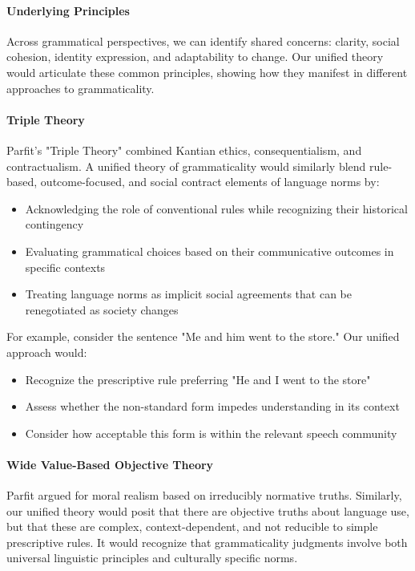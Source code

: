 \paragraph{Underlying Principles} Across grammatical perspectives, we can identify shared concerns: clarity, social cohesion, identity expression, and adaptability to change. Our unified theory would articulate these common principles, showing how they manifest in different approaches to grammaticality.

\paragraph{Triple Theory} Parfit's "Triple Theory" combined Kantian ethics, consequentialism, and contractualism. A unified theory of grammaticality would similarly blend rule-based, outcome-focused, and social contract elements of language norms by:

\begin{itemize}
    \item Acknowledging the role of conventional rules while recognizing their historical contingency
    \item Evaluating grammatical choices based on their communicative outcomes in specific contexts
    \item Treating language norms as implicit social agreements that can be renegotiated as society changes
\end{itemize}

For example, consider the sentence "Me and him went to the store." Our unified approach would:

\begin{itemize}
    \item Recognize the prescriptive rule preferring "He and I went to the store"
    \item Assess whether the non-standard form impedes understanding in its context
    \item Consider how acceptable this form is within the relevant speech community
\end{itemize}

\paragraph{Wide Value-Based Objective Theory} Parfit argued for moral realism based on irreducibly normative truths. Similarly, our unified theory would posit that there are objective truths about language use, but that these are complex, context-dependent, and not reducible to simple prescriptive rules. It would recognize that grammaticality judgments involve both universal linguistic principles and culturally specific norms.

